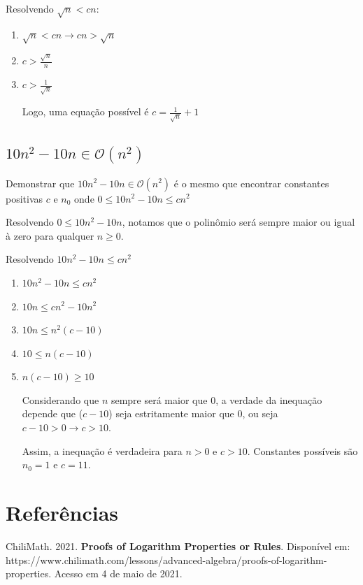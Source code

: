 \documentclass[ a4paper, twocolumn]{article}
\theoremstyle{definition}
\begin{document}
	Resolvendo $\sqrt{n} < cn$:
	\begin{enumerate}[Step 1:]
		\item $\sqrt{n} < cn \rightarrow cn > \sqrt{n}$
		\item $c > \frac{\sqrt{n}}{n}$
		\item $c > \frac{1}{\sqrt{n}}$
		
		Logo, uma equação possível é $c = \frac{1}{\sqrt{n}} + 1$
	\end{enumerate}

\subsection{$10n^2 - 10n \in \mathcal{O}(n^2)$}
	Demonstrar que $10n^2 - 10n \in \mathcal{O}(n^2)$ é o mesmo que encontrar constantes positivas $c$ e $n_0$ onde $0 \leq 10n^2 - 10n \leq cn^2$
	
	Resolvendo $0 \leq 10n^2 - 10n$, notamos que o polinômio será sempre maior ou igual à zero para qualquer $n \geq 0$.
	
	Resolvendo $10n^2 - 10n \leq cn^2$
	\begin{enumerate}[Step 1:]
		\item $10n^2 - 10n \leq cn^2$
		\item $10n \leq cn^2 - 10n^2$
		\item $10n \leq n^2(c - 10)$
		\item $10 \leq n(c - 10)$
		\item $n(c - 10) \geq 10$
		
		Considerando que $n$ sempre será maior que 0, a verdade da inequação depende que ($c-10$) seja estritamente maior que 0, ou seja $c-10 > 0 \rightarrow c > 10$.
		
		Assim, a inequação é verdadeira para $n > 0$ e $c > 10$. Constantes possíveis são $n_0 = 1$ e $c = 11$.
		
	\end{enumerate}
	
\section{Referências}
ChiliMath. 2021. \textbf{Proofs of Logarithm Properties or Rules}. Disponível em:  https://www.chilimath.com/lessons/advanced-algebra/proofs-of-logarithm-properties. Acesso em 4 de maio de 2021.
\end{document}
